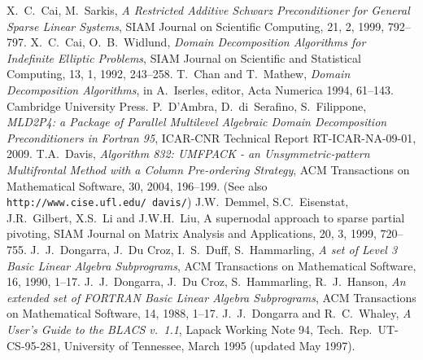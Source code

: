 \begin{thebibliography}{99}
%
%
%
X.~C.~Cai, M.~Sarkis,
{\em A Restricted Additive Schwarz Preconditioner for General Sparse Linear Systems},
SIAM Journal on Scientific Computing, 21, 2, 1999, 792--797.
%
X.~C.~Cai, O.~B.~Widlund,
{\em Domain Decomposition Algorithms for Indefinite Elliptic Problems},
SIAM Journal on Scientific and Statistical Computing, 13, 1, 1992, 243--258.
%
T.~Chan and T.~Mathew,
{\em Domain Decomposition Algorithms},
in A.~Iserles, editor, Acta Numerica 1994, 61--143.
Cambridge University Press.
%
P.~D'Ambra, D.~di~Serafino, S.~Filippone,
\emph{MLD2P4: a Package of Parallel Multilevel
Algebraic Domain Decomposition Preconditioners
in Fortran 95}, ICAR-CNR Technical Report RT-ICAR-NA-09-01, 2009.
%
T.A.~Davis, 
{\em Algorithm 832: UMFPACK - an Unsymmetric-pattern Multifrontal
Method with a Column Pre-ordering Strategy},
ACM Transactions on Mathematical Software, 30, 2004, 196--199.
(See also {\tt http://www.cise.ufl.edu/~davis/})
%
J.W.~Demmel, S.C.~Eisenstat, J.R.~Gilbert, X.S.~Li and J.W.H.~Liu,
A supernodal approach to sparse partial pivoting,
SIAM Journal on Matrix Analysis and Applications, 20, 3, 1999, 720--755.
%
J.~J.~Dongarra, J.~Du Croz, I.~S.~Duff, S.~Hammarling,
\emph{A set of Level 3 Basic Linear Algebra Subprograms},
ACM Transactions on Mathematical Software, 16, 1990, 1--17.
%
J.~J.~Dongarra, J.~Du Croz, S.~Hammarling, R.~J.~Hanson,
\emph{An extended set of FORTRAN Basic Linear Algebra Subprograms},
ACM Transactions on Mathematical Software, 14, 1988, 1--17.
%
J.~J.~Dongarra and R.~C.~Whaley,
{\em A User's Guide to the BLACS v.~1.1},
Lapack Working Note 94, Tech.\ Rep.\ UT-CS-95-281, University of
Tennessee, March 1995 (updated May 1997).
%
%

\end{thebibliography}
